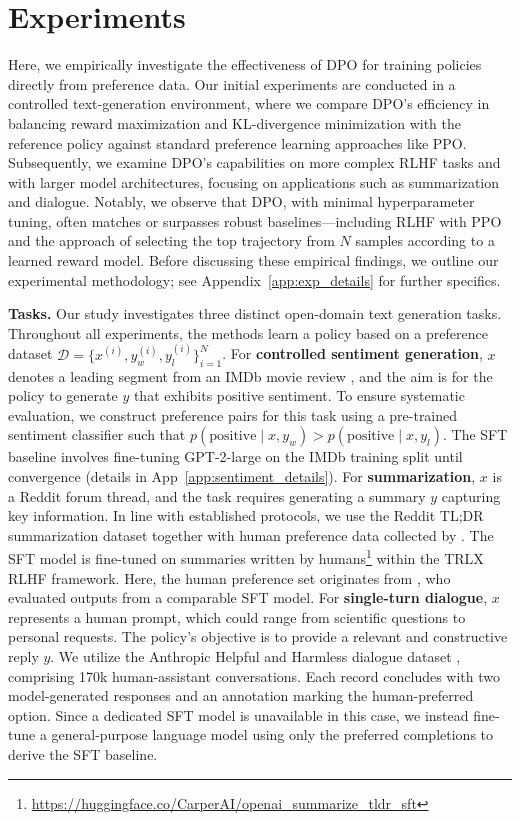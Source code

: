 \section{Experiments}
Here, we empirically investigate the effectiveness of DPO for training policies directly from preference data. Our initial experiments are conducted in a controlled text-generation environment, where we compare DPO's efficiency in balancing reward maximization and KL-divergence minimization with the reference policy against standard preference learning approaches like PPO. Subsequently, we examine DPO's capabilities on more complex RLHF tasks and with larger model architectures, focusing on applications such as summarization and dialogue. Notably, we observe that DPO, with minimal hyperparameter tuning, often matches or surpasses robust baselines—including RLHF with PPO and the approach of selecting the top trajectory from $N$ samples according to a learned reward model. Before discussing these empirical findings, we outline our experimental methodology; see Appendix~\ref{app:exp_details} for further specifics.

\textbf{Tasks.} Our study investigates three distinct open-domain text generation tasks. Throughout all experiments, the methods learn a policy based on a preference dataset $\mathcal{D}=\bigl\{x^{(i)}, y_w^{(i)}, y_l^{(i)}\bigr\}_{i=1}^N$. For \textbf{controlled sentiment generation}, $x$ denotes a leading segment from an IMDb movie review \cite{maas-EtAl:2011:ACL-HLT2011}, and the aim is for the policy to generate $y$ that exhibits positive sentiment. To ensure systematic evaluation, we construct preference pairs for this task using a pre-trained sentiment classifier such that $p(\text{positive}\mid x,y_w)>p(\text{positive}\mid x,y_l)$. The SFT baseline involves fine-tuning GPT-2-large on the IMDb training split until convergence (details in App~\ref{app:sentiment_details}). For \textbf{summarization}, $x$ is a Reddit forum thread, and the task requires generating a summary $y$ capturing key information. In line with established protocols, we use the Reddit TL;DR summarization dataset \citep{volske-etal-2017-tl} together with human preference data collected by \citeauthor{stiennon2022learning}. The SFT model is fine-tuned on summaries written by humans\footnote{\url{https://huggingface.co/CarperAI/openai_summarize_tldr_sft}} within the TRLX \citep{leandro_von_werra_2023_7790115} RLHF framework. Here, the human preference set originates from \citeauthor{stiennon2022learning}, who evaluated outputs from a comparable SFT model. For \textbf{single-turn dialogue}, $x$ represents a human prompt, which could range from scientific questions to personal requests. The policy’s objective is to provide a relevant and constructive reply $y$. We utilize the Anthropic Helpful and Harmless dialogue dataset \citep{bai2022training}, comprising 170k human-assistant conversations. Each record concludes with two model-generated responses and an annotation marking the human-preferred option. Since a dedicated SFT model is unavailable in this case, we instead fine-tune a general-purpose language model using only the preferred completions to derive the SFT baseline.

